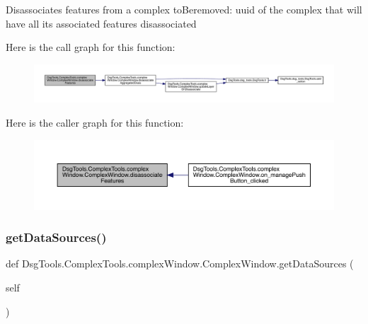 \begin{DoxyVerb}Disassociates features from a complex
toBeremoved: uuid of the complex that will have all its associated features disassociated
\end{DoxyVerb}
 Here is the call graph for this function\+:
\nopagebreak
\begin{figure}[H]
\begin{center}
\leavevmode
\includegraphics[width=350pt]{class_dsg_tools_1_1_complex_tools_1_1complex_window_1_1_complex_window_a3efb68c68cbf91f00a3432f53e965d2b_cgraph}
\end{center}
\end{figure}
Here is the caller graph for this function\+:
\nopagebreak
\begin{figure}[H]
\begin{center}
\leavevmode
\includegraphics[width=350pt]{class_dsg_tools_1_1_complex_tools_1_1complex_window_1_1_complex_window_a3efb68c68cbf91f00a3432f53e965d2b_icgraph}
\end{center}
\end{figure}
\mbox{\label{class_dsg_tools_1_1_complex_tools_1_1complex_window_1_1_complex_window_a4342f9df9ceb2b074509474ce8fa32d0}} 
\subsubsection{\texorpdfstring{get\+Data\+Sources()}{getDataSources()}}
{\footnotesize\ttfamily def Dsg\+Tools.\+Complex\+Tools.\+complex\+Window.\+Complex\+Window.\+get\+Data\+Sources (\begin{DoxyParamCaption}\item[{}]{self }\end{DoxyParamCaption})}

